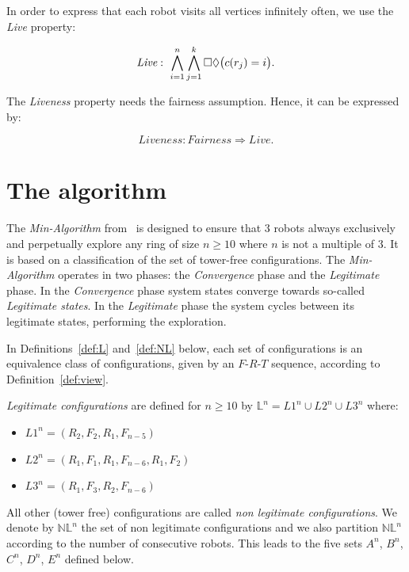 In order to express that each robot visits all vertices infinitely
often, we use the \emph{Live} property: 

$$\textit{Live}: ~\bigwedge\limits_{i=1}^n\bigwedge\limits_{j=1}^k
\Box\Diamond\big(c(r_j)=i\big).$$

The \textit{Liveness} property needs the fairness assumption. Hence, it
can be expressed by: 

$$\textit{Liveness}: \textit{Fairness} \Rightarrow \textit{Live}.$$

		\section{The algorithm}
	\label{subsec:mindef}
The \emph{Min-Algorithm} from~\cite{blin_exclusive_2010} is designed
to ensure that $3$ robots always exclusively and perpetually explore
any ring of size $n \geq 10$ where $n$ is not a multiple of $3$.  It
is based on a classification of the set of tower-free configurations.
The \emph{Min-Algorithm} operates in two phases: the
\emph{Convergence} phase and the \emph{Legitimate} phase.  In the
\emph{Convergence} phase system states converge towards so-called
\emph{Legitimate states}. In the \emph{Legitimate} phase the system
cycles between its legitimate states, performing the exploration.  

In Definitions~\ref{def:L} and~\ref{def:NL} below, each set of
configurations is an equivalence class of configurations, given by an
$F$-$R$-$T$ sequence, according to Definition~\ref{def:view}.

\begin{definition}
  \label{def:L}\emph{Legitimate configurations} are defined for $n\geq
  10$ by $\mathbb{L}^n = L1^n \cup L2^n \cup L3^n$ where: 
\begin{itemize}%
\item$L1^n=(R_2, F_2, R_1, F_{n-5} )$
\item $L2^n=(R_1, F_1, R_1, F_{n-6}, R_1, F_2)$
\item $L3^n=(R_1, F_3, R_2, F_{n-6})$
\end{itemize}
\end{definition}

All other (tower free) configurations are called \emph{non legitimate
  configurations}. We denote by $\mathbb{NL}^n$ the set of non
legitimate configurations and we also partition $\mathbb{NL}^n$
according to the number of consecutive robots. This leads to the five
sets $A^n$, $B^n$, $C^n$, $D^n$, $ E^n$ defined below.

